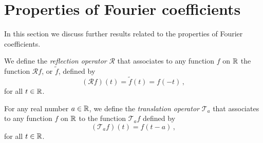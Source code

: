 \section{Properties of Fourier coefficients}
In this section we discuss further results related to the properties of Fourier
coefficients.
\begin{definition}
	We define the \emph{reflection operator} $\mathcal{R}$ that associates to any function
	$f$ on $\mathbb{R}$ the function $\mathcal{R}f$, or $\tilde{f}$, defined by
	\begin{equation}
		(\mathcal{R}f)(t)=\tilde{f}(t)=f(-t)\,,
	\end{equation}
	for all $t\in\mathbb{R}$.
\end{definition}
\begin{definition}
	For any real number $a\in\mathbb{R}$, we define the \emph{translation operator} $\mathcal{T}_a$
	that associates to any function $f$ on $\mathbb{R}$ to the function $\mathcal{T}_af$ defined by
	\begin{equation}
		(\mathcal{T}_af)(t)=f(t-a)\,,
	\end{equation}
	for all $t\in\mathbb{R}$.
\end{definition}

